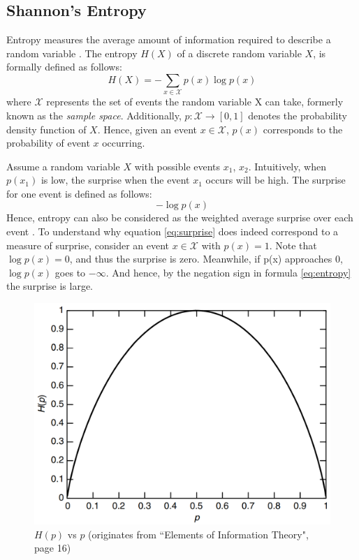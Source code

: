 	\subsection{Shannon's Entropy}
	Entropy measures the average amount of information required to describe a random variable \citep{coverElementsInformationTheory2006}. The entropy $H(X)$ of a discrete random variable $X$, is formally defined as follows: 
	\begin{equation}
		H(X) = -\sum_{x\in\mathcal{X}} p(x) \log p(x)  \label{eq:entropy}
	\end{equation}
	where $\mathcal{X}$ represents the set of events the random variable X can take, formerly known as the \textit{sample space}. Additionally, $p: \mathcal{X} \rightarrow [0, 1]$ denotes the probability density function of $X$. Hence, given an event $ x \in \mathcal{X}$, $p(x)$ corresponds to the probability of event $x$ occurring.
	
	Assume a random variable $X$ with possible events $x_1$, $x_2$. Intuitively, when $p(x_1)$ is low, the surprise when the event $x_1$ occurs will be high. The surprise for one event is defined as follows:
	\begin{equation}
		- \log p(x) \label{eq:surprise}
	\end{equation}
	Hence, entropy can also be considered as the weighted average surprise over each event \citep{datasciencecoursesAliGhodsiLec2017}. 
	To understand why equation \ref{eq:surprise} does indeed correspond to a measure of surprise, consider an event $x \in \mathcal{X}$ with $p(x) = 1$. Note that $\log p(x) = 0$, and thus the surprise is zero. Meanwhile, if p(x) approaches $0$, $\log p(x)$ goes to $- \infty$. And hence, by the negation sign in formula \ref{eq:entropy} the surprise is large.
	
	
	\begin{figure}[h]
		\centering
		\includegraphics[width=0.4\linewidth]{screenshot005}
		\caption{$H(p)$ vs $p$ (originates from ``Elements of Information Theory", page 16)}
		\label{fig:EntropyvsP}
	\end{figure}
	
